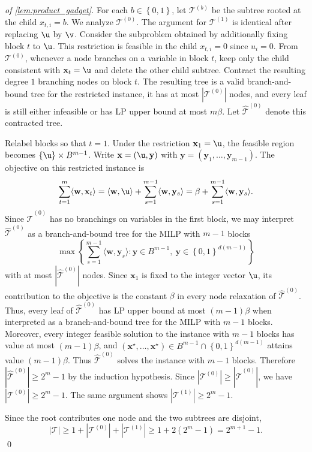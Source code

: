 \documentclass[smallextended,envcountsect]{svjour3} %
\let\ACCu\u
\let\ACCv\v
\newcommand{\set}[1]{\left\{#1\right\}}
\newcommand{\x}{\mathbf{x}}
\newcommand{\y}{\mathbf{y}}
\newcommand{\w}{\mathbf{w}}
\renewcommand{\u}{\mathbf{u}}
\renewcommand{\v}{\mathbf{v}}
\newcommand{\Tcal}{\mathcal{T}}
\newcommand{\0}{\mathbf{0}}
\newcommand{\1}{\mathbf{1}} %
\let\u\ACCu
\let\v\ACCv
\begin{document}
\begin{proof}[of \cref{lem:product_gadget}]
	For each $b\in\set{0,1}$, let $\Tcal^{(b)}$ be the subtree rooted at the child $x_{t,i}=b$.
	We analyze $\Tcal^{(0)}$.
	The argument for $\Tcal^{(1)}$ is identical after replacing $\u$ by $\v$.
	Consider the subproblem obtained by additionally fixing block $t$ to $\u$.
	This restriction is feasible in the child $x_{t,i}=0$ since $u_i=0$.
	From $\Tcal^{(0)}$, whenever a node branches on a variable in block $t$, keep only the child consistent with $\x_t=\u$ and delete the other child subtree.
	Contract the resulting degree $1$ branching nodes on block $t$.
		The resulting tree is a valid branch-and-bound tree for the restricted instance, it has at most $|\Tcal^{(0)}|$ nodes, and every leaf is still either infeasible or has LP upper bound at most $m\beta$. Let $\widehat{\Tcal}^{(0)}$ denote this contracted tree.

	Relabel blocks so that $t=1$.
	Under the restriction $\x_1=\u$, the feasible region becomes $\set{\u}\times B^{m-1}$.
	Write $\x=(\u,\y)$ with $\y=(\y_1,\dots,\y_{m-1})$.
	The objective on this restricted instance is
	\[
		\sum_{t=1}^m\langle\w,\x_t\rangle=\langle\w,\u\rangle+\sum_{s=1}^{m-1}\langle\w,\y_s\rangle=\beta+\sum_{s=1}^{m-1}\langle\w,\y_s\rangle.
	\]
	    Since $\widehat{\Tcal}^{(0)}$ has no branchings on variables in the first block, we may interpret $\widehat{\Tcal}^{(0)}$ as a branch-and-bound tree for the MILP with $m-1$ blocks
	\[
		\max\set{\sum_{s=1}^{m-1}\langle\w,\y_s\rangle:\y\in B^{m-1},\ \y\in\set{0,1}^{d(m-1)}}
	\]
	with at most $|\widehat{\Tcal}^{(0)}|$ nodes.
	Since $\x_1$ is fixed to the integer vector $\u$, its contribution to the objective is the constant $\beta$ in every node relaxation of $\widehat{\Tcal}^{(0)}$.
		Thus, every leaf of $\widehat{\Tcal}^{(0)}$ has LP upper bound at most $(m-1)\beta$ when interpreted as a branch-and-bound tree for the MILP with $m-1$ blocks.
	Moreover, every integer feasible solution to the instance with $m-1$ blocks has value at most $(m-1)\beta$, and $(\x^\star,\dots,\x^\star)\in B^{m-1}\cap\set{0,1}^{d(m-1)}$ attains value $(m-1)\beta$.
	Thus $\widehat{\Tcal}^{(0)}$ solves the instance with $m-1$ blocks.
	Therefore $|\widehat{\Tcal}^{(0)}|\ge 2^{m}-1$ by the induction hypothesis.
    Since $|\Tcal^{(0)}| \ge |\widehat{\Tcal}^{(0)}|$, we have $|\Tcal^{(0)}| \ge 2^m-1$. 
	The same argument shows $|\Tcal^{(1)}|\ge 2^{m}-1$.

	Since the root contributes one node and the two subtrees are disjoint,
	\[
		|\Tcal|\ge 1+|\Tcal^{(0)}|+|\Tcal^{(1)}|\ge 1+2(2^{m}-1)=2^{m+1}-1.
	\]
\leavevmode\qed
	\end{proof}
\end{document}
